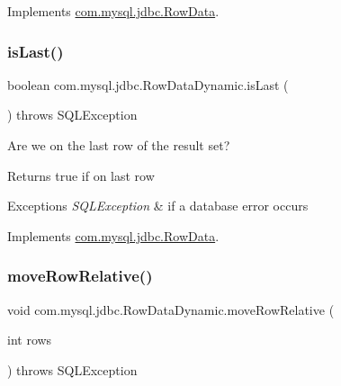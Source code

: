 Implements \mbox{\hyperlink{interfacecom_1_1mysql_1_1jdbc_1_1_row_data_a4bcee2924cecb7f100d887963d6b5b70}{com.\+mysql.\+jdbc.\+Row\+Data}}.

\mbox{\label{classcom_1_1mysql_1_1jdbc_1_1_row_data_dynamic_a40c7f46703795e1c0a508668f82a02fe}} 
\subsubsection{\texorpdfstring{is\+Last()}{isLast()}}
{\footnotesize\ttfamily boolean com.\+mysql.\+jdbc.\+Row\+Data\+Dynamic.\+is\+Last (\begin{DoxyParamCaption}{ }\end{DoxyParamCaption}) throws S\+Q\+L\+Exception}

Are we on the last row of the result set?

\begin{DoxyReturn}{Returns}
true if on last row 
\end{DoxyReturn}

\begin{DoxyExceptions}{Exceptions}
{\em S\+Q\+L\+Exception} & if a database error occurs \\
\hline
\end{DoxyExceptions}


Implements \mbox{\hyperlink{interfacecom_1_1mysql_1_1jdbc_1_1_row_data_a372c70885e7272deb3ad84fefb75eebb}{com.\+mysql.\+jdbc.\+Row\+Data}}.

\mbox{\label{classcom_1_1mysql_1_1jdbc_1_1_row_data_dynamic_a4e4efbc17c848aff355ecbb68b2646ec}} 
\subsubsection{\texorpdfstring{move\+Row\+Relative()}{moveRowRelative()}}
{\footnotesize\ttfamily void com.\+mysql.\+jdbc.\+Row\+Data\+Dynamic.\+move\+Row\+Relative (\begin{DoxyParamCaption}\item[{int}]{rows }\end{DoxyParamCaption}) throws S\+Q\+L\+Exception}

